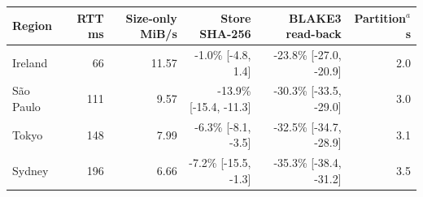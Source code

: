 
\begin{tabular}{@{}lrrrrr@{}}
\toprule
Region & RTT ms & Size-only MiB/s & Store SHA-256 & BLAKE3 read-back & Partition$^a$ s \\
\midrule
Ireland & 66 & 11.57 & -1.0\% [-4.8, 1.4] & -23.8\% [-27.0, -20.9] & 2.0 \\
S\~ao Paulo & 111 & 9.57 & -13.9\% [-15.4, -11.3] & -30.3\% [-33.5, -29.0] & 3.0 \\
Tokyo & 148 & 7.99 & -6.3\% [-8.1, -3.5] & -32.5\% [-34.7, -28.9] & 3.1 \\
Sydney & 196 & 6.66 & -7.2\% [-15.5, -1.3] & -35.3\% [-38.4, -31.2] & 3.5 \\
\bottomrule
\end{tabular}

